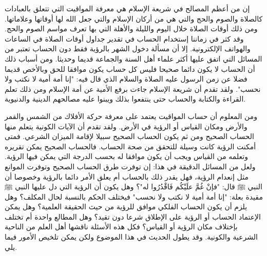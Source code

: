 إن من أعظم المصالح في شريعة الإسلام هي معرفة المواقيت التي تتعلق بالعبادات كالصلاة والصوم والحج والتي هي من أركان الإسلام والتي جعل الله لها أوقاتها وعلاماتها. ومن ذلك أوقات الصلاة خلال اليوم والليلة والأهلة التي بها تعرف مواسم الصوم والحج. وقد كثر في زماننا إستخدام الحساب في تقدير جداول أوقات الصلاة في الساعات والهواتف الإلكترونية. إلا أن مسألة دخول الشهر بالرؤية فقط دون الحساب تعتبر من المسائل التي اتفق عليها أكثر علماء أهل السنة والجماعة قديما وحديثا. ومن أسباب ذلك أن الحساب لا يكون دائما صحيحا فليس كل حساب يكون موافقا للحق وبالأخص قديما فضلا عن زمن الرسول عليه الصلاة والسلام الذي قال فيه: "إنا أمة أمية لا نكتب ولا نحسب". ولقد تقدم أن شريعة الإسلام جاءت برفع الأمية عن أمة الإسلام ومن ذلك تعلم القراءة والكتابة والحساب حتى ينتفعوا بذلك ويبنوا عليه مصالحهم الدينية والدنيوية.

ومن المعلوم أن حساب المواقيت يعتمد على معرفة حركة الأفلاك من الشمس والقمر والأرض ومكان القياس أو الرؤية في الأرض. ولقد تقدم أن الآيات الكونية يتعلم منها الحساب الصحيح ومن ثم يكون الحساب الصحيح سبيلا لإقامة الميزان الشرعي. فمتى أمكنت الرؤية كانت وسيلة للتحقق من صحة الحساب. فالحساب الصحيح يمكن تقريره وتعلمه من القياس ويجب أن يكون موافقا له بحسب الدرجة التي يمكن فيها الرؤية. ولعل من المسائل الدقيقة في هذا: إن توفرت طرق الحساب الصحيح وتوفرت الموانع مثل إنعدام الرؤية، فهل يقدر ذلك بالحساب أم يعلق الأمر دائما بالرؤية وخصوصا أن النبي ﷺ قال: "فإنْ غُمَّ علَيْكُم فَاقْدُرُوا له"؟ وهل يكون أن الرؤية التي دل عليها النبي ﷺ مقيدة بعلة: "إنا أمة أمية لا نكتب ولا نحسب" فيختلف الحكم بالنسبة لحال المكلف؟ وهل يلزم أن يكون الحساب الفلكي موافق للرؤية من حيث الحقيقة العلمية؟ وهل يمكن الإعتماد الحساب أو الرؤية على الإطلاق شرعا دون تقيد؟ وهل المطالع واحدة أم تختلف بإختلاف مكان الرؤية أو القياس؟ فكل هذه الأسئلة ناقشها أهل العلم من الناحية الشرعية والكونية. وقد يطول الحديث في هذا الموضوع ولكن يمكن تلخيص الأمور فيما يلي.

